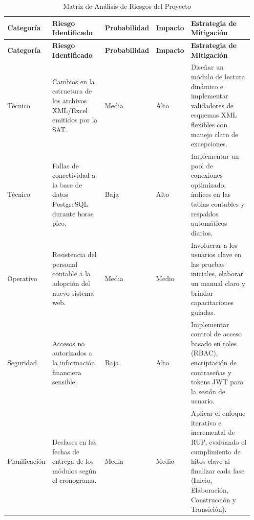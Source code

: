 {
\small
{}
\setlength{\parindent}{0pt}
\begin{xltabular}{\linewidth}{
    >{\raggedright\arraybackslash}p{2.5cm} 
    >{\raggedright\arraybackslash}p{3.5cm} 
    >{\raggedright\arraybackslash}p{1.8cm} 
    >{\raggedright\arraybackslash}p{1.8cm} 
    >{\raggedright\arraybackslash}X
}

    \caption{Matriz de Análisis de Riesgos del Proyecto} \label{tab:analisis_riesgos} \\
    \toprule
    \textbf{Categoría} & \textbf{Riesgo Identificado} & \textbf{Probabilidad} & \textbf{Impacto} & \textbf{Estrategia de Mitigación} \\
    \midrule
    \endfirsthead

    \toprule
    \textbf{Categoría} & \textbf{Riesgo Identificado} & \textbf{Probabilidad} & \textbf{Impacto} & \textbf{Estrategia de Mitigación} \\
    \midrule
    \endhead

    \endfoot

    \bottomrule
\endlastfoot

    Técnico & Cambios en la estructura de los archivos XML/Excel emitidos por la SAT. & Media & Alto & Diseñar un módulo de lectura dinámico e implementar validadores de esquemas XML flexibles con manejo claro de excepciones. \\
    \addlinespace
    Técnico & Fallas de conectividad a la base de datos PostgreSQL durante horas pico. & Baja & Alto & Implementar un pool de conexiones optimizado, índices en las tablas contables y respaldos automáticos diarios. \\
    \addlinespace
    Operativo & Resistencia del personal contable a la adopción del nuevo sistema web. & Media & Medio & Involucrar a los usuarios clave en las pruebas iniciales, elaborar un manual claro y brindar capacitaciones guiadas. \\
    \addlinespace
    Seguridad & Accesos no autorizados a la información financiera sensible. & Baja & Alto & Implementar control de acceso basado en roles (RBAC), encriptación de contraseñas y tokens JWT para la sesión de usuario. \\
    \addlinespace
    Planificación & Desfases en las fechas de entrega de los módulos según el cronograma. & Media & Medio & Aplicar el enfoque iterativo e incremental de RUP, evaluando el cumplimiento de hitos clave al finalizar cada fase (Inicio, Elaboración, Construcción y Transición). \\
\end{xltabular}
}
